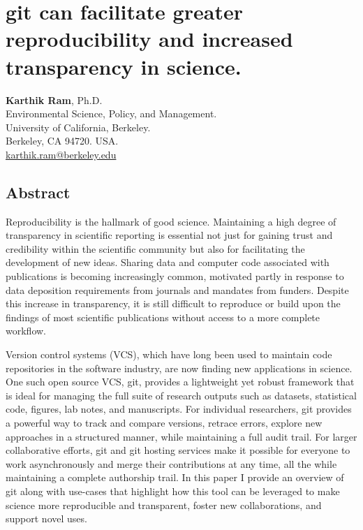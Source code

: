 \documentclass[]{article}
\author{}
\date{}
\begin{document}
\section{git can facilitate greater reproducibility and increased
transparency in science.}

\textbf{Karthik Ram}, Ph.D.\\Environmental Science, Policy, and
Management.\\University of California, Berkeley.\\Berkeley, CA 94720.
USA.\\\href{mailto:karthik.ram@berkeley.edu}{karthik.ram@berkeley.edu}

\subsection{Abstract}

Reproducibility is the hallmark of good science. Maintaining a high
degree of transparency in scientific reporting is essential not just for
gaining trust and credibility within the scientific community but also
for facilitating the development of new ideas. Sharing data and computer
code associated with publications is becoming increasingly common,
motivated partly in response to data deposition requirements from
journals and mandates from funders. Despite this increase in
transparency, it is still difficult to reproduce or build upon the
findings of most scientific publications without access to a more
complete workflow.

Version control systems (VCS), which have long been used to maintain
code repositories in the software industry, are now finding new
applications in science. One such open source VCS, git, provides a
lightweight yet robust framework that is ideal for managing the full
suite of research outputs such as datasets, statistical code, figures,
lab notes, and manuscripts. For individual researchers, git provides a
powerful way to track and compare versions, retrace errors, explore new
approaches in a structured manner, while maintaining a full audit trail.
For larger collaborative efforts, git and git hosting services make it
possible for everyone to work asynchronously and merge their
contributions at any time, all the while maintaining a complete
authorship trail. In this paper I provide an overview of git along with
use-cases that highlight how this tool can be leveraged to make science
more reproducible and transparent, foster new collaborations, and
support novel uses.
\end{document}
